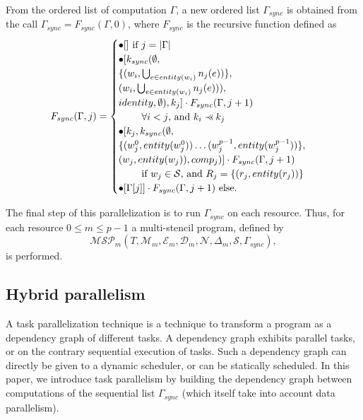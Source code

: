 \begin{mydef}
From the ordered list of computation $\Gamma$, a new ordered list $\Gamma_{sync}$ is obtained from the call $\Gamma_{sync} = F_{sync}(\Gamma,0)$, where $F_{sync}$ is the recursive function defined as
\begin{equation*}
F_{sync}(\Gamma,j) = 
\begin{cases} 	\bullet [] \mbox{ if }j=|\Gamma|\\
				\bullet [k_{sync}(\emptyset,\\
				\{(w_i,\bigcup_{e \in entity(w_i)} n_j(e))\},\\
				(w_i,\bigcup_{e \in entity(w_i)} n_j(e))),\\
				identity,\emptyset), k_j] \cdot F_{sync}(\Gamma,j+1)\\
				\text{ } \qquad \forall i<j \text{, and }k_i \pprec k_j\\
				\bullet [k_j, k_{sync}(\emptyset,\\
				\{(w^0_j,entity(w^0_j)) \dots (w^{p-1}_j,entity(w^{p-1}_j))\},\\
				(w_j,entity(w_j)),comp_j)] \cdot F_{sync}(\Gamma,j+1)\\ 
				\text{ } \qquad \mbox{if } w_j \in \mathcal{S} \text{, and } R_j=\{(r_j,entity(r_j))\}\\
				\bullet [\Gamma[j]] \cdot F_{sync}(\Gamma,j+1) \text{ else}.
\end{cases}
\end{equation*}
\end{mydef}


 The final step of this parallelization is to run $\Gamma_{sync}$ on each resource. Thus, for each resource $0 \leq m \leq p-1$ a multi-stencil program, defined by
\begin{equation}
\mathcal{MSP}_m(T,\mathcal{M}_m,\mathcal{E}_m,\mathcal{D}_m,\mathcal{N},\Delta_m,\mathcal{S},\Gamma_{sync}),
\end{equation}
is performed.

\subsection{Hybrid parallelism}
A task parallelization technique is a technique to transform a program as a dependency graph of different tasks. A dependency graph exhibits parallel tasks, or on the contrary sequential execution of tasks. Such a dependency graph can directly be given to a dynamic scheduler, or can be statically scheduled. In this paper, we introduce task parallelism by building the dependency graph between computations of the sequential list $\Gamma_{sync}$ (which itself take into account data parallelism).

